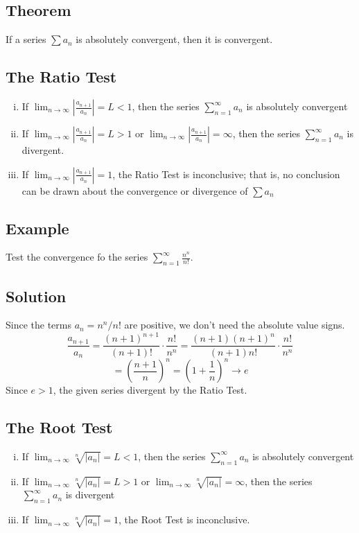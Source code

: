 \subsection*{Theorem}
If a series $\sum a_n$ is absolutely convergent, then it is convergent.

\subsection*{The Ratio Test}
\begin{enumerate}[(i)]
    \item If $\lim_{n \to \infty} |\frac{a_{n+1}}{a_n}| = L < 1$, then the series
          $\sum_{n=1}^\infty a_n$ is absolutely convergent
    \item If $\lim_{n \to \infty} |\frac{a_{n+1}}{a_n}| = L > 1$ or
          $\lim_{n \to \infty} |\frac{a_{n+1}}{a_n}| = \infty$, then the series $\sum_{n=1}^\infty a_n$ is divergent.
          \enlargethispage{\baselineskip}
    \item If $\lim_{n \to \infty} |\frac{a_{n+1}}{a_n}| = 1$, the Ratio Test is inconclusive; that is,
          no conclusion can be drawn about the convergence or divergence of $\sum a_n$
\end{enumerate}

\subsection*{Example}
Test the convergence fo the series $\sum_{n=1}^\infty\frac{n^n}{n!}$.

\subsection*{Solution}
Since the terms $a_n=n^n/n!$ are positive, we don't need the absolute value signs.
$$\frac{a_{n+1}}{a_n}=\frac{(n+1)^{n+1}}{(n+1)!}\cdot\frac{n!}{n^n}=
    \frac{(n+1)(n+1)^n}{(n+1)n!}\cdot\frac{n!}{n^n}$$
$$=\left(\frac{n+1}{n}\right)^n=\left(1+\frac{1}{n}\right)^n\to e$$
Since $e>1$, the given series divergent by the Ratio Test.

\subsection*{The Root Test}
\begin{enumerate}[(i)]
    \item If $\lim_{n \to \infty} \sqrt[n]{|a_n|} = L < 1$, then the series $\sum_{n=1}^\infty a_n$ is absolutely convergent
    \item If $\lim_{n \to \infty} \sqrt[n]{|a_n|} = L > 1$ or
          $\lim_{n \to \infty} \sqrt[n]{|a_n|} = \infty$, then the series $\sum_{n=1}^\infty a_n$ is divergent
    \item If $\lim_{n \to \infty} \sqrt[n]{|a_n|} = 1$, the Root Test is inconclusive.
\end{enumerate}

